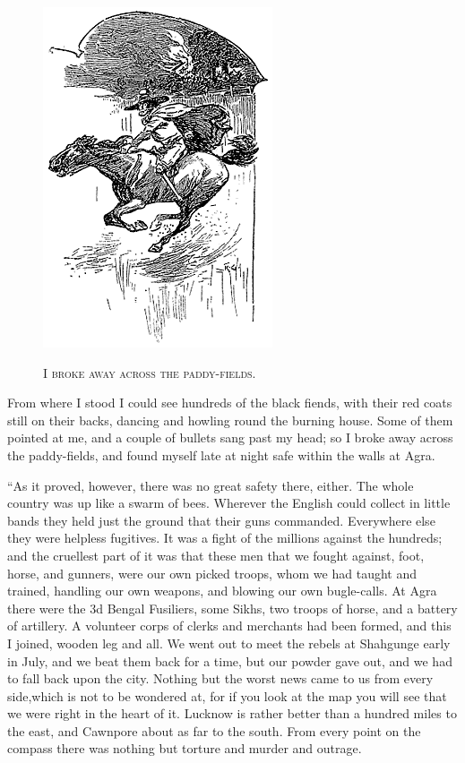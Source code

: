\documentclass[12pt,english,oneside]{book}
\newcommand{\noun}[1]{\textsc{#1}}
\begin{document}
\begin{figure}[htbp]
\noindent \begin{center}\includegraphics{images/sign410-sign-20.png}\end{center}

\noindent \begin{center}\noun{I broke away across the paddy-fields.}\end{center}
\end{figure}
From where I stood I could see hundreds of the black fiends, with
their red coats still on their backs, dancing and howling round the
burning house. Some of them pointed at me, and a couple of bullets
sang past my head; so I broke away across the paddy-fields, and found
myself late at night safe within the walls at Agra.

{}``As it proved, however, there was no great safety there, either.
The whole country was up like a swarm of bees. Wherever the English
could collect in little bands they held just the ground that their
guns commanded. Everywhere else they were helpless fugitives. It was
a fight of the millions against the hundreds; and the cruellest part
of it was that these men that we fought against, foot, horse, and
gunners, were our own picked troops, whom we had taught and trained,
handling our own weapons, and blowing our own bugle-calls. At Agra
there were the 3d Bengal Fusiliers, some Sikhs, two troops of horse,
and a battery of artillery. A volunteer corps of clerks and merchants
had been formed, and this I joined, wooden leg and all. We went out
to meet the rebels at Shahgunge early in July, and we beat them back
for a time, but our powder gave out, and we had to fall back upon
the city. Nothing but the worst news came to us from every side,\mdsh{---}which
is not to be wondered at, for if you look at the map you will see
that we were right in the heart of it. Lucknow is rather better than
a hundred miles to the east, and Cawnpore about as far to the south.
From every point on the compass there was nothing but torture and
murder and outrage.
\end{document}
